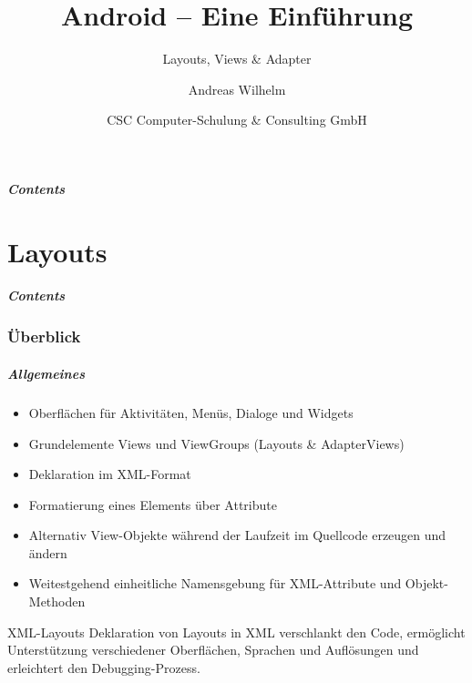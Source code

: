 \title{Android -- Eine Einführung}
\subtitle{Layouts, Views \& Adapter}
\author[A. Wilhelm]{Andreas Wilhelm}
\titlegraphic{}
\date{CSC Computer-Schulung \& Consulting GmbH}

\begin{frame}[plain]
  \titlepage
\end{frame}

\section[Contents]{}
\begin{frame}
	\frametitle{Contents}
	\tableofcontents[onlyparts]
\end{frame}

\part{Layouts}
\frame{\partpage}
\begin{frame}
	\frametitle{Contents}
	\tableofcontents[]
\end{frame}

\section{Überblick}
\begin{frame}
   \frametitle{Allgemeines}
   \begin{itemize}
      \item Oberflächen für Aktivitäten, Menüs, Dialoge und Widgets
      \item Grundelemente Views und ViewGroups (Layouts \& AdapterViews)
      \item Deklaration im XML-Format
      \item Formatierung eines Elements über Attribute
      \item Alternativ View-Objekte während der Laufzeit im Quellcode 
         erzeugen und ändern
      \item Weitestgehend einheitliche Namensgebung für XML-Attribute 
         und Objekt-Methoden
   \end{itemize}

   \begin{alertblock}{XML-Layouts}
      Deklaration von Layouts in XML verschlankt den Code, 
      ermöglicht Unterstützung verschiedener Oberflächen, Sprachen 
      und Auflösungen und erleichtert den Debugging-Prozess.
   \end{alertblock}
\end{frame}


